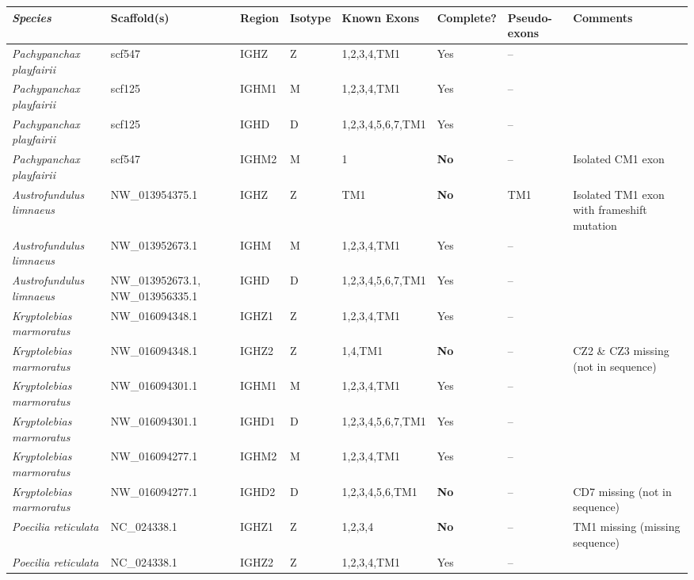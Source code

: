 	\begin{landscape}
	\centering
	\vspace*{\fill}
    \scriptsize
    \begin{threeparttable}
\begin{tabular}{>{\itshape}lllllllp{4cm}}
  \toprule \textnormal{\textbf{Species}} & \textbf{Scaffold(s)} & \textbf{Region} & \textbf{Isotype} & \textbf{Known Exons} \tnote{1} & \textbf{Complete?} & \textbf{Pseudo-exons} & \textbf{Comments} \\ 
  \midrule Pachypanchax playfairii & scf547 & IGHZ & Z & 1,2,3,4,TM1 & Yes & -- &  \\ 
  Pachypanchax playfairii & scf125 & IGHM1 & M & 1,2,3,4,TM1 & Yes & -- &  \\ 
  Pachypanchax playfairii & scf125 & IGHD & D & 1,2,3,4,5,6,7,TM1 & Yes & -- &  \\ 
  Pachypanchax playfairii & scf547 & IGHM2 & M & 1 & \textbf{No} & -- & Isolated CM1 exon \\ 
  Austrofundulus limnaeus & NW\_013954375.1 & IGHZ & Z & TM1 & \textbf{No} & TM1 & Isolated TM1 exon with frameshift mutation \\ 
  Austrofundulus limnaeus & NW\_013952673.1 & IGHM & M & 1,2,3,4,TM1 & Yes & -- &  \\ 
  Austrofundulus limnaeus & NW\_013952673.1, NW\_013956335.1 & IGHD & D & 1,2,3,4,5,6,7,TM1 & Yes & -- &  \\ 
  Kryptolebias marmoratus & NW\_016094348.1 & IGHZ1 & Z & 1,2,3,4,TM1 & Yes & -- &  \\ 
  Kryptolebias marmoratus & NW\_016094348.1 & IGHZ2 & Z & 1,4,TM1 & \textbf{No} & -- & CZ2 \& CZ3 missing (not in sequence) \\ 
  Kryptolebias marmoratus & NW\_016094301.1 & IGHM1 & M & 1,2,3,4,TM1 & Yes & -- &  \\ 
  Kryptolebias marmoratus & NW\_016094301.1 & IGHD1 & D & 1,2,3,4,5,6,7,TM1 & Yes & -- &  \\ 
  Kryptolebias marmoratus & NW\_016094277.1 & IGHM2 & M & 1,2,3,4,TM1 & Yes & -- &  \\ 
  Kryptolebias marmoratus & NW\_016094277.1 & IGHD2 & D & 1,2,3,4,5,6,TM1 & \textbf{No} & -- & CD7 missing (not in sequence) \\ 
  Poecilia reticulata & NC\_024338.1 & IGHZ1 & Z & 1,2,3,4 & \textbf{No} & -- & TM1 missing (missing sequence) \\ 
  Poecilia reticulata & NC\_024338.1 & IGHZ2 & Z & 1,2,3,4,TM1 & Yes & -- &  \\ 

\end{tabular}
\end{threeparttable}
\end{landscape}
